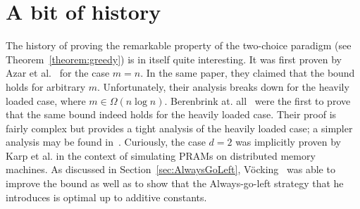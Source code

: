 \documentclass[a4paper,12pt]{article}
\begin{document}
\section{A bit of history}
\label{sec:historyOfGreedy}
The history of proving the remarkable property of the two-choice paradigm (see Theorem~\ref{theorem:greedy}) is in itself quite interesting. It was first proven by Azar et al.~\cite{ABKU99} for the case $m = n$. In the same paper, they claimed that the bound holds for arbitrary $m$. Unfortunately, their analysis breaks down for the heavily loaded case, where $m \in \Omega\left(n  \log n\right)$. Berenbrink at. all~\cite{BCSV06} were the first to prove that the same bound indeed holds for the heavily loaded case. Their proof is fairly complex but provides a tight analysis of the heavily loaded case; a simpler analysis may be found in~\cite{TW13}. Curiously, the case $d = 2$ was implicitly proven by Karp et al. in the context of simulating PRAMs on distributed memory machines\cite{KLM92}. As discussed in Section~\ref{sec:AlwaysGoLeft}, V\"ocking~\cite{VOC03} was able to improve the bound as well as to show that the Always-go-left strategy that he introduces is optimal up to additive constants.


 
\end{document}
